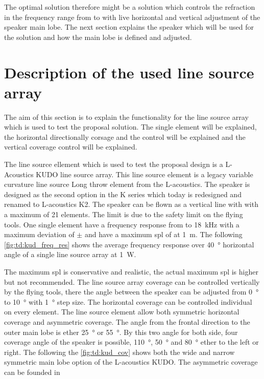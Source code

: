 
The optimal solution therefore might be a solution which controls the refraction in the frequency range from  to  with live horizontal and vertical adjustment of the speaker main lobe. The next section explains the speaker which will be used for the solution and how the main lobe is defined and adjusted.


\section{Description of the used line source array}\label{sec:prop:des_of_lin}

The aim of this section is to explain the functionality for the line source array which is used to test the proposal solution. The single element will be explained, the horizontal directionally corsage and the control will be explained and the vertical coverage control will be explained.

The line source ellement which is used to test the proposal design is a L-Acoustics KUDO line source array. This line source element is a legacy variable curvature line source Long throw element from the L-acoustics. The speaker is designed as the second option in the K series which today is redesigned and renamed to L-acoustics K2. The speaker can be flown as a vertical line with with a maximum of 21 elements. The limit is due to the safety limit on the flying tools. One single element have a frequency response from  to \SI{18}{\kilo\hertz} with a maximum deviation of $\pm$  and have a maximum \gls{spl} of  at \SI{1}{\meter}. The following \autoref{fig:td:kud_freq_res} shows the average frequency response over \SI{40}{\degree} horizontal angle of a single line source array at \SI{1}{\watt}.



The maximum \gls{spl} is conservative and realistic, the actual maximum \gls{spl} is higher but not recommended. The line source array coverage can be controlled vertically by the flying tools, there the angle between the speaker can be adjusted from \SI{0}{\degree} to \SI{10}{\degree} with \SI{1}{\degree} step size. The horizontal coverage can be controlled individual on every element. The line source element allow both symmetric horizontal coverage and asymmetric coverage. The angle from the frontal direction to the outer main lobe  is ether \SI{25}{\degree} or \SI{55}{\degree}. By this two angle for both side, four coverage angle of the speaker is possible, \SI{110}{\degree}, \SI{50}{\degree} and \SI{80}{\degree} ether to the left or right. The following the \autoref{fig:td:kud_cov} shows both the wide and narrow symmetric main lobe option of the L-acoustics KUDO. The asymmetric coverage can be founded in \citep{KUDO_data}

